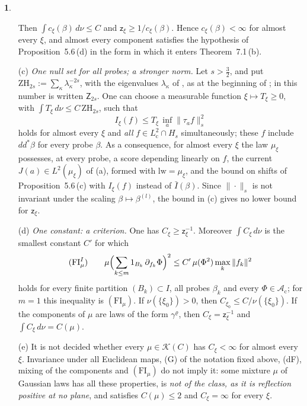 \documentclass[11pt]{amsart}
\newcommand{\namedhead}{}
\theoremstyle{definition}
\newtheorem*{namedinner}{\namedhead}
\newenvironment{named}[1]{\renewcommand{\namedhead}{#1}\begin{namedinner}}{\end{namedinner}}
\begin{document}
\begin{named}{Proposition 7.3}
\begin{itemize}
\begin{equation*}
\end{equation*}
Then $\int c_\xi(\beta)\,d\nu\le C$ and $\mathsf z_\xi\ge1/c_\xi(\beta)$.
Hence $c_\xi(\beta)<\infty$ for almost every $\xi$,
and almost every component satisfies the hypothesis of Proposition~5.6\,(d) in the form in which it enters Theorem~7.1\,(b).
\item[(c)] \emph{One null set for all probes; a stronger norm.}
Let $s>\frac32$, and put $\mathrm{ZH}_{2s}:=\sum_\kappa\lambda_\kappa^{-2s}$, with the eigenvalues $\lambda_\kappa$ of \cite[(n8)]{QEDIII}, as at the beginning of \cite[Section~45]{QEDIII};
in \cite[Section~7.1.5]{QEDI} this number is written $\mathsf Z_{2s}$.
One can choose a measurable function $\xi\mapsto T_\xi\ge0$, with $\int T_\xi\,d\nu\le C\,\mathrm{ZH}_{2s}$, such that
\begin{equation*}
I_\xi(f)\le T_\xi\,\inf_a\|\tau_af\|_s^2
\end{equation*}
holds for almost every $\xi$ and \emph{all} $f\in L^2_{\mathrm c}\cap H_s$ simultaneously;
these $f$ include $dd^*\beta$ for every probe $\beta$.
As a consequence, for almost every $\xi$ the law $\mu_\xi$ possesses, at every probe, a score depending linearly on $f$, the current $J(a)\in L^2(\mu_\xi)$ of (a), formed with $\mathrm{lw}=\mu_\xi$, and the bound on shifts of Proposition~5.6\,(c) with $I_\xi(f)$ instead of $\bar I(\beta)$.
Since $\|\cdot\|_s$ is not invariant under the scaling $\beta\mapsto\beta^{(l)}$, the bound in (c) gives no lower bound for $\mathsf z_\xi$.
\item[(d)] \emph{One constant: a criterion.}
One has $C_\xi\ge\mathsf z_\xi^{-1}$.
Moreover $\int C_\xi\,d\nu$ is the smallest constant $C'$ for which
\begin{equation*}
(\mathrm{FI}^I_\mu)\qquad\mu\Bigl(\sum_{k\le m}1_{B_k}\,\partial_{f_k}\Phi\Bigr)^2\le C'\,\mu(\Phi^2)\max_k\|f_k\|^2
\end{equation*}
holds for every finite partition $(B_k)\subset I$, all probes $\beta_k$ and every $\Phi\in\mathcal A_{\mathrm c}$;
for $m=1$ this inequality is $(\mathrm{FI}_\mu)$.
If $\nu(\{\xi_0\})>0$, then $C_{\xi_0}\le C/\nu(\{\xi_0\})$.
If the components of $\mu$ are laws of the form $\gamma^\varrho$, then $C_\xi=\mathsf z_\xi^{-1}$ and $\int C_\xi\,d\nu=C(\mu)$.
\item[(e)] It is not decided whether every $\mu\in\mathcal K(C)$ has $C_\xi<\infty$ for almost every $\xi$.
Invariance under all Euclidean maps, (G) of the notation fixed above, (dF), mixing of the components and $(\mathrm{FI}_\mu)$ do not imply it:
some mixture $\mu$ of Gaussian laws has all these properties, is \emph{not of the class, as it is reflection positive at no plane}, and satisfies $C(\mu)\le2$ and $C_\xi=\infty$ for every $\xi$.
\end{itemize}
\end{named}
\end{document}
